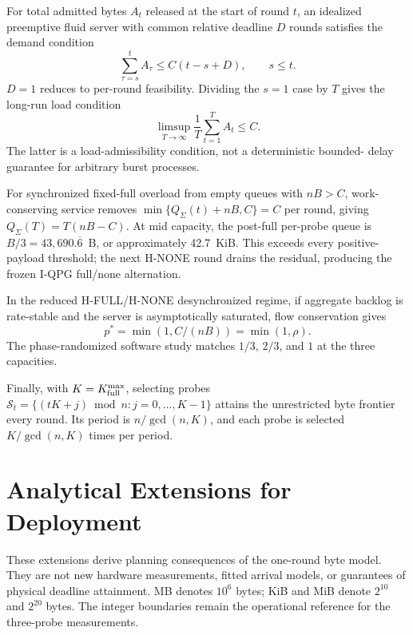 \documentclass[10pt,onecolumn]{IEEEtran}
\begin{document}
For total admitted bytes $A_t$ released at the start of round $t$, an
idealized preemptive fluid server with common relative deadline $D$ rounds
satisfies the demand condition
\[\sum_{\tau=s}^{t}A_\tau\le C(t-s+D),\qquad s\le t.\]
$D=1$ reduces to per-round feasibility. Dividing the $s=1$ case by $T$ gives
the long-run load condition
\[\limsup_{T\to\infty}\frac{1}{T}\sum_{t=1}^{T}A_t\leq C.\]
The latter is a load-admissibility condition, not a deterministic bounded-
delay guarantee for arbitrary burst processes.

For synchronized fixed-full overload from empty queues with $nB>C$,
work-conserving service removes $\min\{Q_\Sigma(t)+nB,C\}=C$ per round,
giving $Q_\Sigma(T)=T(nB-C)$. At mid capacity, the post-full per-probe queue
is $B/3=43{,}690.\overline{6}$~B, or approximately 42.7~KiB. This exceeds
every positive-payload threshold; the next H-NONE round drains the residual,
producing the frozen I-QPG full/none alternation.

In the reduced H-FULL/H-NONE desynchronized regime, if aggregate backlog is
rate-stable and the server is asymptotically saturated, flow conservation
gives
\[p^*=\min(1,C/(nB))=\min(1,\rho).\]
The phase-randomized software study matches $1/3$, $2/3$, and $1$ at the
three capacities.

Finally, with $K=K_{\rm full}^{\max}$, selecting probes
$\mathcal S_t=\{(tK+j)\bmod n:j=0,\ldots,K-1\}$ attains the unrestricted
byte frontier every round. Its period is $n/\gcd(n,K)$, and each probe is
selected $K/\gcd(n,K)$ times per period.


\section{Analytical Extensions for Deployment}
\label{sec:supp_deployment}
These extensions derive planning consequences of the one-round byte model.
They are not new hardware measurements, fitted arrival models, or guarantees
of physical deadline attainment. MB denotes $10^6$ bytes; KiB and MiB denote
$2^{10}$ and $2^{20}$ bytes. The integer boundaries remain the operational
reference for the three-probe measurements.
\end{document}
